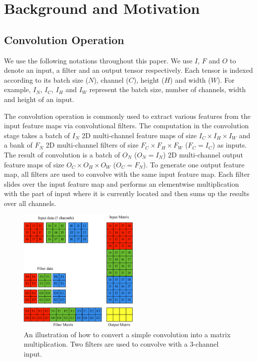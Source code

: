 
\section{Background and Motivation}

\subsection{Convolution Operation}
We use the following notations throughout this paper. We use $I$, $F$ and $O$ to denote an input, a filter and an output tensor
respectively. Each tensor is indexed according to its batch size ($N$), channel ($C$), height ($H$) and width ($W$). For example, $I_N$,
$I_C$, $I_H$ and $I_W$ represent the batch size, number of channels, width and height of an input.

The convolution operation is commonly used to extract various features from the input feature maps via convolutional filters. The computation
in the convolution stage takes a batch of $I_N$ 2D multi-channel feature maps of size $I_C \times I_H \times I_W$ and a bank of $F_N$ 2D
multi-channel filters of size $F_C \times F_H \times F_W$ ($F_C = I_C$) as inputs. The result of convolution is a batch of $O_N$
($O_N=I_N$) 2D multi-channel output feature maps of size $O_C \times O_H \times O_W$ ($O_C=F_N$). To generate one output feature map, all
filters are used to convolve with the same input feature map. Each filter slides over the input feature map and performs an elementwise
multiplication with the part of input where it is currently located  and then sums up the results over all channels.

\begin{figure}
\centering
  \includegraphics[width=0.75\columnwidth,height=6cm]{./figure/convlowering.eps}
  \caption{An illustration of how to convert a simple convolution into a matrix multiplication. Two filters are used to convolve with a 3-channel input.}
  \label{fig:convlowering}
\end{figure}


